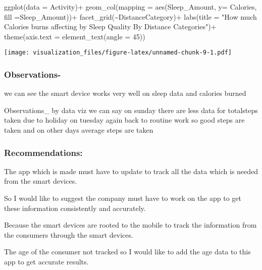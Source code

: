 \documentclass[
]{article}
\newenvironment{Shaded}{\begin{snugshade}}{\end{snugshade}}
\newcommand{\AttributeTok}[1]{\textcolor[rgb]{0.77,0.63,0.00}{#1}}
\newcommand{\DecValTok}[1]{\textcolor[rgb]{0.00,0.00,0.81}{#1}}
\newcommand{\FunctionTok}[1]{\textcolor[rgb]{0.00,0.00,0.00}{#1}}
\newcommand{\NormalTok}[1]{#1}
\newcommand{\SpecialCharTok}[1]{\textcolor[rgb]{0.00,0.00,0.00}{#1}}
\newcommand{\StringTok}[1]{\textcolor[rgb]{0.31,0.60,0.02}{#1}}
\begin{document}
\begin{Shaded}
\begin{Highlighting}[]
\FunctionTok{ggplot}\NormalTok{(}\AttributeTok{data =}\NormalTok{ Activity)}\SpecialCharTok{+}
  \FunctionTok{geom\_col}\NormalTok{(}\AttributeTok{mapping =} \FunctionTok{aes}\NormalTok{(Sleep\_Amount, }\AttributeTok{y=}\NormalTok{ Calories, }\AttributeTok{fill =}\NormalTok{Sleep\_Amount))}\SpecialCharTok{+}
  \FunctionTok{facet\_grid}\NormalTok{(}\SpecialCharTok{\textasciitilde{}}\NormalTok{DistanceCategory)}\SpecialCharTok{+}
  \FunctionTok{labs}\NormalTok{(}\AttributeTok{title =} \StringTok{"How much Calories burns affecting by Sleep Quality By Distance Categories"}\NormalTok{)}\SpecialCharTok{+}
  \FunctionTok{theme}\NormalTok{(}\AttributeTok{axis.text =} \FunctionTok{element\_text}\NormalTok{(}\AttributeTok{angle =} \DecValTok{45}\NormalTok{))}
\end{Highlighting}
\end{Shaded}

\texttt{[image: visualization\_files/figure-latex/unnamed-chunk-9-1.pdf]}

\hypertarget{observations-}{%
\subsubsection{Observations-}\label{observations-}}

we can see the smart device works very well on sleep data and calories
burned

Observations\_ by data viz we can say on sunday there are less data for
totalsteps taken due to holiday on tuesday again back to routine work so
good steps are taken and on other days average steps are taken

\hypertarget{recommendations}{%
\subsubsection{Recommendations:}\label{recommendations}}

The app which is made must have to update to track all the data which is
needed from the smart devices.

So I would like to suggest the company must have to work on the app to
get these information consistently and accurately.

Because the smart devices are rooted to the mobile to track the
information from the consumers through the smart devices.

The age of the consumer not tracked so I would like to add the age data
to this app to get accurate results.
\end{document}
